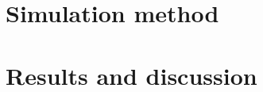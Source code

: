 \documentclass[aip,jcp,preprint]{revtex4-1}
\begin{document}
\section{Simulation method}

%
\section{Results and discussion}

%
%
%
%

%
%
\end{document}
